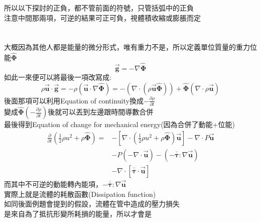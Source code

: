 \documentclass[../main.tex]{subfiles}
\begin{document}
\begin{itemize}
\begin{itemize}
      所以以下探討的正負，都不管前面的符號，只管括弧中的正負\\
      注意中間那兩項，可逆的結果可正可負，視體積收縮或膨脹而定\\
      \\
      \\
      大概因為其他人都是能量的微分形式，唯有重力不是，所以定義單位質量的重力位能$\hat{\bm \Phi}$
      \begin{equation}
        \vec{\bm g} = - \nabla \hat{\bm \Phi}
      \end{equation}
      如此一來便可以將最後一項改寫成:
      \begin{equation}
        \rho  \vec{\bm u}\cdot \vec{\bm g} =
          -\rho ( \vec{\bm u}\cdot \nabla \hat{\bm \Phi})
          = -\left(
          \nabla \cdot (\rho \vec{\bm u} \hat{\bm \Phi})
          \right) + \hat{\bm \Phi} \left(\nabla \cdot \rho \vec{\bm u}\right)
      \end{equation}
      後面那項可以利用Equation of continuity換成$-\frac{\partial \rho}{\partial t}$\\
      變成$\hat{\bm \Phi} \left(-\frac{\partial \rho}{\partial t}\right)$後就可以丟到左邊跟時間導數合併\\
      最後得到Equation of change for mechanical energy(因為合併了動能+位能)
      \begin{align}
        \frac{\partial}{\partial t}\left(\frac{1}{2}\rho u^2 + \rho \hat{\bm \Phi}\right) = 
        &-\left[
          \nabla \cdot \left(
            \frac{1}{2}\rho u^2 + \rho \hat{\bm \Phi}
          \right) \vec{\bm u}
        \right] - \nabla \cdot P \vec{\bm u} \nonumber \\
        &- P\left(-\nabla \cdot \vec{\bm u}\right) - (-\overline{\overline{\bm \tau}} : \nabla \vec{\bm u}) \nonumber \\
        &- \nabla \cdot [\overline{\overline{\bm \tau}} \cdot \vec{\bm u}] 
        \label{eq:mechanical_energy_equation_modified}
      \end{align}
      而其中不可逆的動能轉內能項，$-\overline{\overline{\bm \tau}} : \nabla \vec{\bm u}$\\
      實際上就是流體的耗散函數(Dissipation function)\\
      如同後面例題會提到的假設，流體在管中造成的壓力損失\\
      是來自為了抵抗形變所耗損的能量，所以才會是\\

\end{itemize}
\end{itemize}
\end{document}
